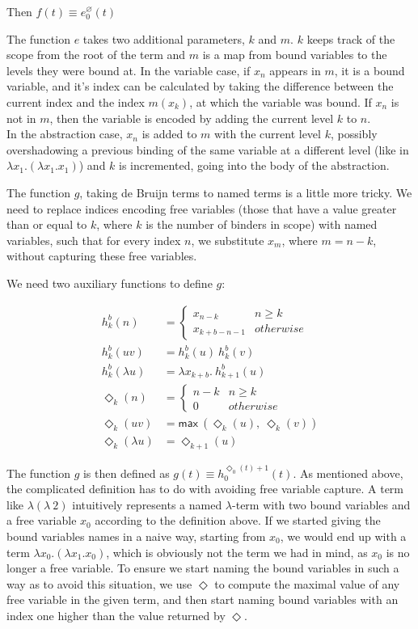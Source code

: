 \documentclass[a4paper, 12pt, twoside]{style/ociamthesis}
\theoremstyle{plain}
\theoremstyle{definition}
\theoremstyle{remark}
\renewcommand{\max}{\textsf{max}\ }
\let\emptyset\varnothing
\begin{document}
Then \(f(t) \equiv e_0^\emptyset(t)\)

The function \(e\) takes two additional parameters, \(k\) and \(m\).
\(k\) keeps track of the scope from the root of the term and \(m\) is a
map from bound variables to the levels they were bound at. In the
variable case, if \(x_n\) appears in \(m\), it is a bound variable, and
it's index can be calculated by taking the difference between the
current index and the index \(m(x_k)\), at which the variable was bound.
If \(x_n\) is not in \(m\), then the variable is encoded by adding the
current level \(k\) to \(n\).\\
In the abstraction case, \(x_n\) is added to \(m\) with the current
level \(k\), possibly overshadowing a previous binding of the same
variable at a different level (like in
\(\lambda x_1. (\lambda x_1. x_1)\)) and \(k\) is incremented, going
into the body of the abstraction.

The function \(g\), taking de Bruijn terms to named terms is a little
more tricky. We need to replace indices encoding free variables (those
that have a value greater than or equal to \(k\), where \(k\) is the
number of binders in scope) with named variables, such that for every
index \(n\), we substitute \(x_m\), where \(m = n-k\), without capturing
these free variables.

We need two auxiliary functions to define \(g\):

\vspace{-2em}\begin{align*} 
h_k^b(n) &= \begin{cases}
x_{n-k} & n \geq k\\
x_{k+b-n-1} & otherwise
\end{cases}\\
h_k^b(uv) &= h_k^b(u)\ h_k^b(v)\\
h_k^b(\lambda u) &= \lambda x_{k+b}.\ h_{k+1}^b(u)\\[2.5em]
\Diamond_k(n) &= \begin{cases}
n-k & n \geq k\\
0 & otherwise
\end{cases}\\
\Diamond_k(uv) &= \max (\Diamond_k(u),\ \Diamond_k(v))\\
\Diamond_k(\lambda u) &= \Diamond_{k+1}(u)
\end{align*}

The function \(g\) is then defined as
\(g(t) \equiv h_0^{\Diamond_0(t)+1}(t)\). As mentioned above, the
complicated definition has to do with avoiding free variable capture. A
term like \(\lambda (\lambda\ 2)\) intuitively represents a named
\(\lambda\)-term with two bound variables and a free variable \(x_0\)
according to the definition above. If we started giving the bound
variables names in a naive way, starting from \(x_0\), we would end up
with a term \(\lambda x_0.(\lambda x_1.x_0)\), which is obviously not
the term we had in mind, as \(x_0\) is no longer a free variable. To
ensure we start naming the bound variables in such a way as to avoid
this situation, we use \(\Diamond\) to compute the maximal value of any
free variable in the given term, and then start naming bound variables
with an index one higher than the value returned by \(\Diamond\).
\end{document}
